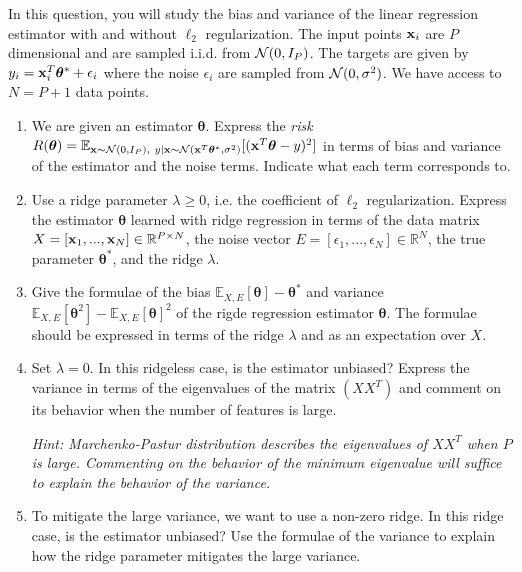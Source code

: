 \documentclass[11pt]{article}
\begin{document}
In this question, you will study the bias and variance of the linear regression estimator with and without $\ell_2$ regularization. 
The input points ${\mathbf x}_i$ are $P$ dimensional and are sampled i.i.d. from $\mathcal{N}(0,I_P)$. 
The targets are given by $y_i = {\mathbf x}_i^T \boldsymbol{\theta}^* + \epsilon_i$ where the noise $\epsilon_i$ are sampled from $\mathcal{N}(0, \sigma^2)$. 
We have access to $N=P+1$ data points. 

\begin{enumerate}[label=(\Alph*)]

\item We are given an estimator $\boldsymbol \theta$. 
Express the \textit{risk} $R(\boldsymbol{\theta}) = \mathbb{E}_{{\mathbf x} \sim \mathcal{N}(0, I_P), \ y|{\mathbf x} \sim \mathcal{N}({\mathbf x}^T \boldsymbol{\theta}^*, \sigma^2)}[ ({\mathbf x}^T \boldsymbol{\theta}- y)^2]$ in terms of 
bias and variance of the estimator and the noise terms. Indicate what each term corresponds to. 

\item Use a ridge parameter $\lambda \geq 0$, i.e. the coefficient of $\ell_2$ regularization. 
Express the estimator $\boldsymbol \theta$ learned with ridge regression in terms of the data matrix $ X = [{\mathbf x}_1, ..., {\mathbf x}_N] \in \mathbb{R}^{P \times N}$, 
the noise vector $E = [\epsilon_1, ..., \epsilon_N] \in \mathbb{R}^N$, the true parameter $\boldsymbol{\theta}^*$, and the ridge $\lambda$. 

\item Give the formulae of the bias $\mathbb{E}_{X, E}[\boldsymbol{\theta}] - \boldsymbol{\theta}^* $ and 
variance $\mathbb{E}_{X, E}[\boldsymbol{\theta}^2] - \mathbb{E}_{X, E}[\boldsymbol{\theta}]^2$ of the rigde regression estimator $\boldsymbol{\theta}$. 
The formulae should be expressed in terms of the ridge $\lambda$ and as an expectation over $X$.

\item Set $\lambda=0$. In this ridgeless case, is the estimator unbiased? Express the variance in terms of the eigenvalues 
of the matrix $ (X X^T) $ and comment on its behavior when the number of features is large. 

\textit{Hint: Marchenko-Pastur distribution describes the eigenvalues of $ X X^T$ when $P$ is large. 
Commenting on the behavior of the minimum eigenvalue will suffice to explain the behavior of the variance.}

\item To mitigate the large variance, we want to use a non-zero ridge. In this ridge case, is the estimator unbiased? 
Use the formulae of the variance to explain how the ridge parameter mitigates the large variance. 



\end{enumerate}
\end{document}
